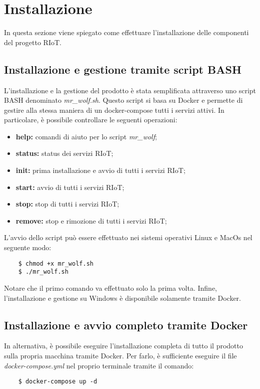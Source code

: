 \section{Installazione}
	In questa sezione viene spiegato come effettuare l'installazione delle componenti del progetto RIoT.

	\subsection{Installazione e gestione tramite script BASH}

	L'installazione e la gestione del prodotto è stata semplificata attraverso uno script BASH denominato \textit{mr\_wolf.sh}. Questo script si basa su Docker e permette di gestire alla stessa maniera di un docker-compose tutti i servizi attivi.
	In particolare, è possibile controllare le seguenti operazioni: 
	\begin{itemize}
		\item \textbf{help:}  	comandi di aiuto per lo script \textit{mr\_wolf};
    	\item \textbf{status:}  status dei servizi RIoT;
    	\item \textbf{init:}  	prima installazione e avvio di tutti i servizi RIoT;
    	\item \textbf{start:} 	avvio di tutti i servizi RIoT;
    	\item \textbf{stop:}  	stop di tutti i servizi RIoT;
    	\item \textbf{remove:}	stop e rimozione di tutti i servizi RIoT;
	\end{itemize}
	L'avvio dello script può essere effettuato nei sistemi operativi Linux e MacOs nel seguente modo:
	\begin{verbatim}
	$ chmod +x mr_wolf.sh
	$ ./mr_wolf.sh
	\end{verbatim}
	Notare che il primo comando va effettuato solo la prima volta. Infine, l'installazione e gestione su Windows è disponibile solamente tramite Docker.

	\subsection{Installazione e avvio completo tramite Docker}
	
	In alternativa, è possibile eseguire l'installazione completa di tutto il prodotto sulla propria macchina tramite Docker. Per farlo, è sufficiente eseguire il file \textit{docker-compose.yml} nel proprio terminale tramite il comando:
	\begin{verbatim}
	$ docker-compose up -d
	\end{verbatim}

